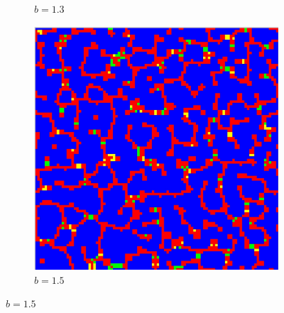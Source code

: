 \documentclass[12pt]{article}
\begin{document}
\begin{figure}[!htbp]
\begin{subfigure}{.33\textwidth}
            \caption{$b=1.3$}
            \label{fig:sub2}
            \end{subfigure}%
            \begin{subfigure}{.33\textwidth}
            \centering
            \includegraphics[width=.9\linewidth]{MeanFieldGame/snapshot_b=15.jpg}
            \caption{$b=1.5$}
            \label{fig:sub3}
            \end{subfigure}
            

\end{figure}
\end{document}
